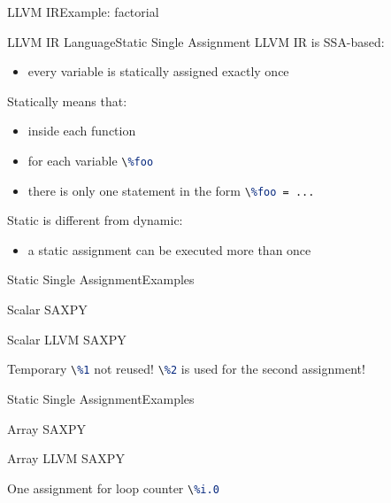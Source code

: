 \documentclass[10pt,mathserif]{beamer}
\newcommand{\cinput}[1]{}
\newcommand{\llvminput}[1]{}
\newcommand{\llvminline}[1]{\lstinline[language=LLVM]!#1!}
\begin{document}
\begin{frame}{LLVM IR}{Example: factorial}
	
	\begin{center}
		\llvminput{snippet/01/fact.ll}
	\end{center}
\end{frame}

\begin{frame}{LLVM IR Language}{Static Single Assignment}
	LLVM IR is SSA-based:
	
	\begin{itemize}
		\item every variable is \alert{statically assigned} exactly \alert{once}
	\end{itemize}
	
	Statically means that:
	
	\begin{itemize}
		\item inside each function
		\item for each variable \llvminline{\%foo}
		\item there is only one statement in the form \llvminline{\%foo = ...}
	\end{itemize}
	
	Static is different from dynamic:
	
	\begin{itemize}
		\item a static assignment can be executed more than once
	\end{itemize}
\end{frame}

\begin{frame}{Static Single Assignment}{Examples}
	\begin{block}{Scalar SAXPY}
		\centering
		\cinput{snippet/02/scalar-saxpy.c}
	\end{block}
	
	\begin{block}{Scalar LLVM SAXPY}
		\centering
		\llvminput{snippet/02/scalar-saxpy.ll}
	\end{block}
	
	Temporary \llvminline{\%1} not reused! \llvminline{\%2} is used for the second
	assignment!
\end{frame}

\begin{frame}{Static Single Assignment}{Examples}
	\begin{block}{Array SAXPY}
		\centering
		\cinput{snippet/02/array-saxpy.c}
	\end{block}
	
	\begin{block}{Array LLVM SAXPY}
		\centering
		\llvminput{snippet/02/array-saxpy.ll}
	\end{block}
	
	One assignment for loop counter \llvminline{\%i.0}
\end{frame}
\end{document}
